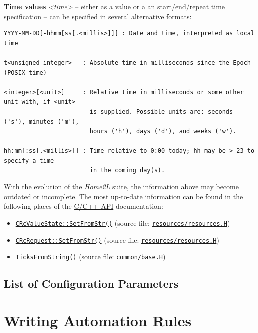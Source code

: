 \documentclass[12pt,english,parskip=half,headheight=19pt]{scrreprt}
\newcommand{\refdoc}[2]{\href{#1}{#2}}              %
\newcommand{\refsrc}[1]{\href{#1}{\texttt{#1}}}     %
\newcommand{\refapic}[1]{\href{home2l-api_c/index.html}{\mbox{\texttt{#1}}}}            %
\newcommand{\theapic}{\refdoc{home2l-api_c/index.html}{C/C++ API}}
\begin{document}
\textbf{Time values} \textit{<time>} -- either as a value or a an start/end/repeat time specification --  can be
specified in several alternative formats:
\begin{lstlisting}
YYYY-MM-DD[-hhmm[ss[.<millis>]]] : Date and time, interpreted as local time

t<unsigned integer>   : Absolute time in milliseconds since the Epoch (POSIX time)

<integer>[<unit>]     : Relative time in milliseconds or some other unit with, if <unit>
                        is supplied. Possible units are: seconds ('s'), minutes ('m'),
                        hours ('h'), days ('d'), and weeks ('w').

hh:mm[:ss[.<millis>]] : Time relative to 0:00 today; hh may be > 23 to specify a time
                        in the coming day(s).
\end{lstlisting}

With the evolution of the \textit{Home2L} suite, the information above may become outdated or incomplete. The most up-to-date information can be found in the following places of the \theapic{} documentation:

\begin{itemize}
\item
  \refapic{CRcValueState::SetFromStr()} (source file: \refsrc{resources/resources.H})
\item
  \refapic{CRcRequest::SetFromStr()} (source file: \refsrc{resources/resources.H})
\item
  \refapic{TicksFromString()} (source file: \refsrc{common/base.H})
\end{itemize}





\section{List of Configuration Parameters}
\label{sec:resources-env}







%
\chapter{Writing Automation Rules}
\label{ch:rules}
%
\end{document}
